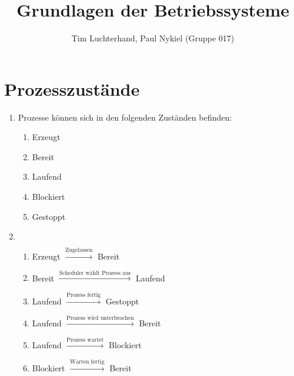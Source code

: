 \documentclass[DIN, pagenumber=false, fontsize=11pt, parskip=half]{scrartcl}
\title{Grundlagen der Betriebssysteme}
\author{Tim Luchterhand, Paul Nykiel (Gruppe 017)}
\begin{document}
    \maketitle
    \section{Prozesszustände}
    \begin{enumerate}[label=(\alph*)]
        \item Prozesse können sich in den folgenden Zuständen befinden:
            \begin{enumerate}
                \item Erzeugt
                \item Bereit
                \item Laufend
                \item Blockiert
                \item Gestoppt
            \end{enumerate}
        \item $ $
            \begin{enumerate}
                \item Erzeugt $\stackrel{\text{Zugelassen}}{\longrightarrow}$ Bereit
                \item Bereit $\stackrel{\text{Scheduler wählt Prozess aus}}{\longrightarrow}$ Laufend
                \item Laufend $\stackrel{\text{Prozess fertig}}{\longrightarrow}$ Gestoppt
                \item Laufend $\stackrel{\text{Prozess wird unterbrochen}}{\longrightarrow}$ Bereit
                \item Laufend $\stackrel{\text{Prozess wartet}}{\longrightarrow}$ Blockiert
                \item Blockiert $\stackrel{\text{Warten fertig}}{\longrightarrow}$ Bereit
            \end{enumerate}
    \end{enumerate}
\end{document}
